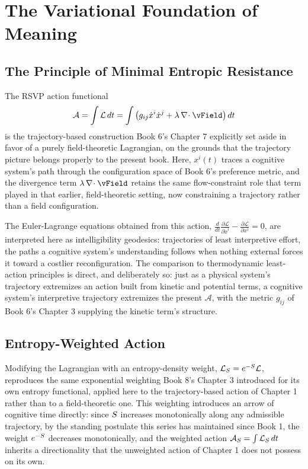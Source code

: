 \part{The Variational Foundation of Meaning}

\chapter{The Principle of Minimal Entropic Resistance}

The RSVP action functional
\[
\mathcal{A} = \int \mathcal{L}\, dt = \int \left( g_{ij} \dot{x}^i \dot{x}^j + \lambda \, \diverg \vField \right) dt
\]
is the trajectory-based construction Book 6's Chapter 7 explicitly set aside in favor of a purely field-theoretic Lagrangian, on the grounds that the trajectory picture belongs properly to the present book. Here, $x^i(t)$ traces a cognitive system's path through the configuration space of Book 6's preference metric, and the divergence term $\lambda \, \diverg \vField$ retains the same flow-constraint role that term played in that earlier, field-theoretic setting, now constraining a trajectory rather than a field configuration.

The Euler-Lagrange equations obtained from this action, $\frac{d}{dt}\frac{\partial \mathcal{L}}{\partial \dot{x}^i} - \frac{\partial \mathcal{L}}{\partial x^i} = 0$, are interpreted here as intelligibility geodesics: trajectories of least interpretive effort, the paths a cognitive system's understanding follows when nothing external forces it toward a costlier reconfiguration. The comparison to thermodynamic least-action principles is direct, and deliberately so: just as a physical system's trajectory extremizes an action built from kinetic and potential terms, a cognitive system's interpretive trajectory extremizes the present $\mathcal{A}$, with the metric $g_{ij}$ of Book 6's Chapter 3 supplying the kinetic term's structure.

\chapter{Entropy-Weighted Action}

Modifying the Lagrangian with an entropy-density weight, $\mathcal{L}_{S} = e^{-S} \mathcal{L}$, reproduces the same exponential weighting Book 8's Chapter 3 introduced for its own entropy functional, applied here to the trajectory-based action of Chapter 1 rather than to a field-theoretic one. This weighting introduces an arrow of cognitive time directly: since $S$ increases monotonically along any admissible trajectory, by the standing postulate this series has maintained since Book 1, the weight $e^{-S}$ decreases monotonically, and the weighted action $\mathcal{A}_{S} = \int \mathcal{L}_{S}\, dt$ inherits a directionality that the unweighted action of Chapter 1 does not possess on its own.

